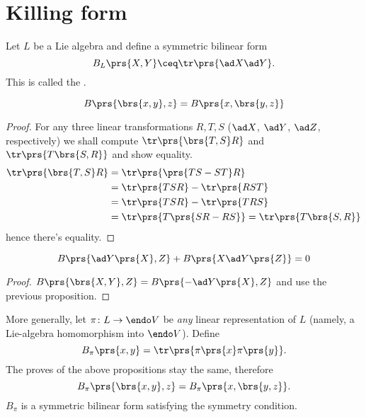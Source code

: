 \documentclass[10pt,a4paper,twoside,openany,hidelinks]{book}
\begin{document}
\chapter{Killing form}

Let $L$ be a Lie algebra and define a symmetric bilinear form
\[B_L\prs{X,Y} \ceq \tr \prs{\ad X \ad Y}\text{.}\]
This is called the .

\begin{proposition}
\[B\prs{\brs{x,y},z} = B\prs{x,\brs{y,z}}\]
\end{proposition}
\begin{proof}
For any three linear transformations $R,T,S$ ($\ad X$, $\ad Y$, $\ad Z$, respectively) we shall compute $\tr \prs{\brs{T,S} R}$ and $\tr \prs{T \brs{S,R}}$ and show equality.
\begin{align*}
\tr \prs{\brs{T,S} R} &= \tr \prs{\prs{TS - ST}R} \\&=
\tr \prs{TSR} - \tr \prs{RST} \\&=
\tr\prs{TSR} - \tr\prs{TRS} \\&=
\tr\prs{T \prs{SR -RS}} = \tr\prs{T \brs{S,R}}
\end{align*}
hence
there's equality.
\end{proof}
\begin{proposition}
\[B\prs{\ad Y\prs{X}, Z} + B\prs{X \ad Y\prs{Z}} = 0\]
\end{proposition}
\begin{proof}
$B\prs{\brs{X,Y},Z} = B\prs{-\ad Y\prs{X} , Z}$ and use the previous proposition.
\end{proof}

More generally, let $\pi \colon L \to \endo V$ be \emph{any} linear representation of $L$ (namely, a Lie-algebra homomorphism into $\endo V$).
Define \[B_{\pi}\prs{x,y} = \tr \prs{\pi\prs{x}\pi\prs{y}} \text{.}\]
The proves of the above propositions stay the same, therefore
\[B_{\pi} \prs{\brs{x,y},z} = B_{\pi}\prs{x, \brs{y,z}} \text{.}\]
$B_{\pi}$ is a symmetric bilinear form satisfying the symmetry condition.
\backmatter
\end{document}
